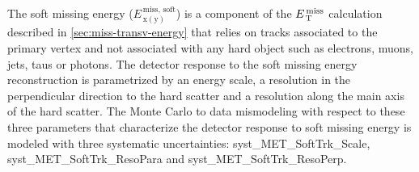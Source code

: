 The soft missing energy ($E_\mathrm{\, x(y)}^\mathrm{\, miss,\, \text{soft}}$)
is a component of the $E_\mathrm{\, T}^\mathrm{\, miss}$ calculation described in
\cref{sec:miss-transv-energy} that relies on tracks associated to the primary
vertex and not associated with any hard object such as electrons, muons, jets,
taus or photons. The detector response to the soft missing energy reconstruction
is parametrized by an energy scale, a resolution in the perpendicular direction
to the hard scatter and a resolution along the main axis of the hard
scatter. The Monte Carlo to data mismodeling with respect to these three
parameters that characterize the detector response to soft missing energy is
modeled with three systematic uncertainties: syst\_MET\_SoftTrk\_Scale,
syst\_MET\_SoftTrk\_ResoPara and syst\_MET\_SoftTrk\_ResoPerp.

